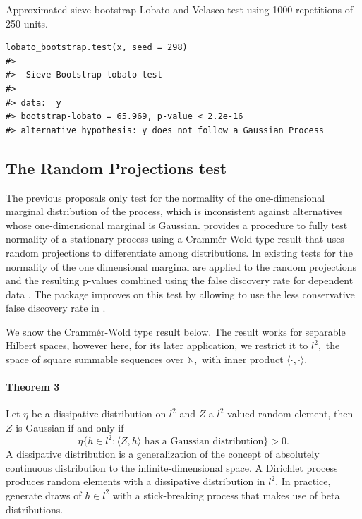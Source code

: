 Approximated sieve bootstrap Lobato and Velasco test using 1000 repetitions of 250 units.

\begin{verbatim}
lobato_bootstrap.test(x, seed = 298)
#> 
#>  Sieve-Bootstrap lobato test
#> 
#> data:  y
#> bootstrap-lobato = 65.969, p-value < 2.2e-16
#> alternative hypothesis: y does not follow a Gaussian Process
\end{verbatim}

\subsection{The Random Projections test}\label{the-random-projections-test}

The previous proposals only test for the normality of the one-dimensional marginal distribution of the process, which is inconsistent against alternatives whose one-dimensional marginal is Gaussian. \citet{nietoreyes2014} provides a procedure to fully test normality of a stationary process using a Crammér-Wold type result \citep{Cuesta2007} that uses random projections to differentiate among distributions. In \citet{nietoreyes2014} existing tests for the normality of the one dimensional marginal are applied to the random projections and the resulting p-values combined using the false discovery rate for dependent data \citep{Benjamin2001}. The  package improves on this test by allowing to use the less conservative false discovery rate in \citet{Benjamin1995}.

We show the Crammér-Wold type result below. The result works for separable Hilbert spaces, however here, for its later application, we restrict it to \(l^2,\) the space of square summable sequences over \(\mathbb{N},\) with inner product \(\langle \cdot,\cdot \rangle.\)

\paragraph{\texorpdfstring{Theorem 3 \citep[Theorem 3.6]{Cuesta2007}}{Theorem 3 {[}@Cuesta2007, Theorem 3.6{]}}}\label{theorem-3-cuesta2007-theorem-3.6}

Let \(\eta\) be a dissipative distribution on \(l^2\) and \(Z\) a \(l^2\)-valued random element, then \(Z\) is Gaussian if and only if
\[
 \eta\{h \in l^2: \langle Z,h \rangle \text{ has a Gaussian distribution}\} > 0.
\]
A dissipative distribution \citep[Definition 2.1]{nietoreyes2014} is a generalization of the concept of absolutely continuous distribution to the infinite-dimensional space. A Dirichlet process \citep{gelman2013} produces random elements with a dissipative distribution in \(l^2\). In practice, generate draws of \(h \in l^2\) with a stick-breaking process that makes use of beta distributions.

